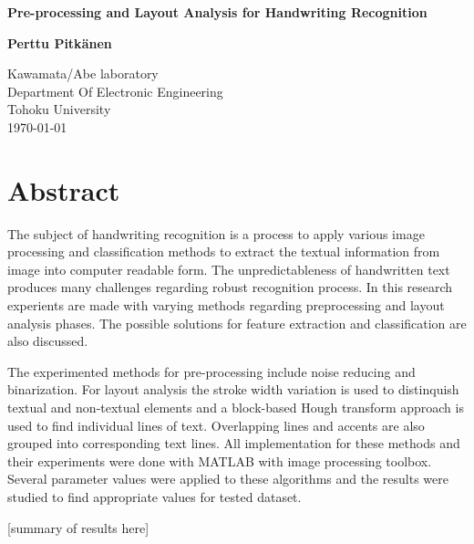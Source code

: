 \documentclass{article}
\begin{document}
   \begin{titlepage}
     \begin{center}
       \vspace*{1cm}

        \huge
        \textbf{Pre-processing and Layout Analysis for Handwriting Recognition}

        \vspace{2cm}

        \textbf{Perttu Pitk{\"a}nen}

        \vfill
        \Large
        Kawamata/Abe laboratory\\
        Department Of Electronic Engineering\\
        Tohoku University\\
        \today
     \end{center}
   \end{titlepage}

   \newpage
   \section*{Abstract}
    The subject of handwriting recognition is a process to apply various image processing and classification methods to extract the textual information from image into computer readable form. The unpredictableness of handwritten text produces many challenges regarding robust recognition process. In this research experients are made with varying methods regarding preprocessing and layout analysis phases. The possible solutions for feature extraction and classification are also discussed.

    The experimented methods for pre-processing include noise reducing and binarization. For layout analysis the stroke width variation is used to distinquish textual and non-textual elements and a block-based Hough transform approach is used to find individual lines of text. Overlapping lines and accents are also grouped into corresponding text lines. All implementation for these methods and their experiments were done with MATLAB with image processing toolbox. Several parameter values were applied to these algorithms and the results were studied to find appropriate values for tested dataset.

    [summary of results here]

   \newpage
   \tableofcontents

   \newpage
\end{document}
